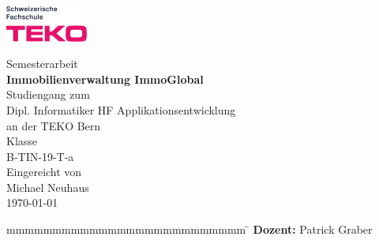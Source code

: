 \newcommand{\arbeit}{Semesterarbeit}
\newcommand{\autor}{Michael Neuhaus}
\newcommand{\gutachter}{Patrick Graber}
\newcommand{\thema}{Immobilienverwaltung ImmoGlobal}
\newcommand{\studiengang}{Dipl. Informatiker HF Applikationsentwicklung}
\newcommand{\studienjahrgang}{B-TIN-19-T-a}
\newcommand{\datumAbgabe}{\today}

\begin{titlepage}
    \includegraphics[width=2.7cm]{content/images/teko.png}
	\enlargethispage{20mm}
	\begin{center}
		\vspace*{12mm}	{\large\normalfont \arbeit}\\
		\vspace*{12mm}	{\huge\bfseries \thema }\\
    \vspace*{12mm}  Studiengang zum \\
		\vspace*{3mm}	  \studiengang\\
    \vspace*{3mm}   an der TEKO Bern\\
    \vspace*{3mm}   Klasse\\ 
    \vspace*{2mm}   \studienjahrgang\\
		\vspace*{12mm}	Eingereicht von\\
		\vspace*{3mm} 	{\large\normalfont \autor}\\
		\vspace*{12mm}	\datumAbgabe\\
	\end{center}
	\vspace{2cm}
	\begin{figure}[htp]
		\begin{center}
		\end{center}
	\end{figure}
	\vfill
	\begin{spacing}{1.2}
		\begin{tabbing}
			mmmmmmmmmmmmmmmmmmmmmmmmmm      \= \kill
			\textbf{Dozent:}                 \>  \gutachter
		\end{tabbing}
		\end{spacing}
		\vspace*{20mm}
\end{titlepage}
